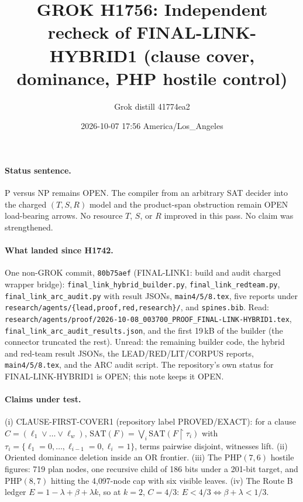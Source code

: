 \documentclass[11pt]{article}
\title{GROK H1756: Independent recheck of FINAL-LINK-HYBRID1 (clause cover, dominance, PHP hostile control)}
\author{Grok distill 41774ea2}
\date{2026-10-07 17:56 America/Los\_Angeles}
\begin{document}
\maketitle
\paragraph{Status sentence.} P versus NP remains OPEN. The compiler from an arbitrary SAT decider into the charged $(T,S,R)$ model and the product-span obstruction remain OPEN load-bearing arrows. No resource $T$, $S$, or $R$ improved in this pass. No claim was strengthened.

\paragraph{What landed since H1742.} One non-GROK commit, \texttt{80b75aef} (FINAL-LINK1: build and audit charged wrapper bridge): \texttt{final\_link\_hybrid\_builder.py}, \texttt{final\_link\_redteam.py}, \texttt{final\_link\_arc\_audit.py} with result JSONs, \texttt{main4/5/8.tex}, five reports under \texttt{research/agents/\{lead,proof,red,research\}/}, and \texttt{spines.bib}. Read: \texttt{research/agents/proof/2026-10-08\_003700\_PROOF\_FINAL-LINK-HYBRID1.tex}, \texttt{final\_link\_arc\_audit\_results.json}, and the first 19\,kB of the builder (the connector truncated the rest). Unread: the remaining builder code, the hybrid and red-team result JSONs, the LEAD/RED/LIT/CORPUS reports, \texttt{main4/5/8.tex}, and the ARC audit script. The repository's own status for FINAL-LINK-HYBRID1 is OPEN; this note keeps it OPEN.

\paragraph{Claims under test.} (i) CLAUSE-FIRST-COVER1 (repository label PROVED/EXACT): for a clause $C=(\ell_1\vee\dots\vee\ell_w)$, $\mathrm{SAT}(F)=\bigvee_i\mathrm{SAT}(F\restriction\tau_i)$ with $\tau_i=\{\ell_1{=}0,\dots,\ell_{i-1}{=}0,\ell_i{=}1\}$, terms pairwise disjoint, witnesses lift. (ii) Oriented dominance deletion inside an OR frontier. (iii) The PHP$(7,6)$ hostile figures: 719 plan nodes, one recursive child of 186 bits under a 201-bit target, and PHP$(8,7)$ hitting the 4{,}097-node cap with six visible leaves. (iv) The Route B ledger $E=1-\lambda+\beta+\lambda k$, so at $k=2$, $C=4/3$: $E<4/3\iff\beta+\lambda<1/3$.
\end{document}
